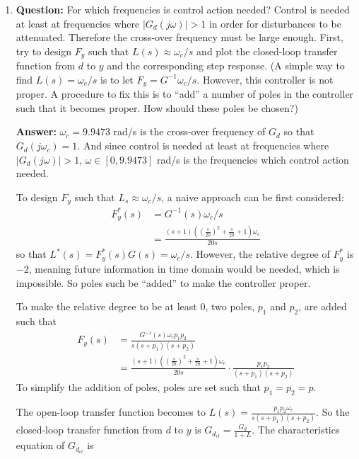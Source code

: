\documentclass[11pt,a4paper]{article}
\begin{document}
\begin{enumerate}[(1)]
	\item \textbf{Question:} For which frequencies is control action needed? Control is needed at least at frequencies where $\vert G_{d}(j\omega) \vert > 1$ in order for disturbances to be attenuated. Therefore the cross-over frequency must be large enough. First, try to design $F_{y}$ such that $L(s) \approx \omega_{c} / s$ and plot the closed-loop transfer function from $d$ to $y$ and the corresponding step response. (A simple way to find $L(s) = \omega_{c} / s$ is to let $F_{y} = G^{-1} \omega_{c} / s$. However, this controller is not proper. A procedure to fix this is to ``add'' a number of poles in the controller such that it becomes proper. How should these poles be chosen?)
	\par \textbf{Answer:} $\omega_{c} = 9.9473$ rad/s is the cross-over frequency of $G_{d}$ so that $G_{d}(j\omega_{c}) = 1$. And since control is needed at least at frequencies where $\vert G_{d}(j\omega) \vert > 1$, $\omega \in [0, 9.9473]$ rad/s is the frequencies which control action needed.
	\par To design $F_{y}$ such that $L_{s} \approx \omega_{c} / s$, a naive approach can be first considered:
	\begin{align*}
		F_{y}^{*}(s) &= G^{-1}(s) \omega_{c} / s \\
		&= \frac{(s+1)((\frac{s}{20})^{2}+\frac{s}{20}+1)\omega_{c}}{20s}
	\end{align*}
	so that $L^{*}(s) = F_{y}^{*}(s) G(s) = \omega_{c} / s$. However, the relative degree of $F_{y}^{*}$ is $-2$, meaning future information in time domain would be needed, which is impossible. So poles such be ``added'' to make the controller proper.
	\par To make the relative degree to be at least $0$, two poles, $p_{1}$ and $p_{2}$, are added such that
	\begin{align*}
		F_{y}(s) &= \frac{G^{-1}(s)\omega_{c}p_{1}p_{2}}{s(s+p_{1})(s+p_{2})} \\
		&= \frac{(s+1)((\frac{s}{20})^{2}+\frac{s}{20}+1)\omega_{c}}{20s} \cdot \frac{p_{1}p_{2}}{(s+p_{1})(s+p_{2})}
	\end{align*}
	To simplify the addition of poles, poles are set such that $p_{1}=p_{2}=p$.
	\par The open-loop transfer function becomes to $L(s) = \frac{p_{1}p_{2}\omega_{c}}{s(s+p_{1})(s+p_{2})}$. So the closed-loop transfer function from $d$ to $y$ is $G_{d_{cl}}=\frac{G_{d}}{1+L}$. The characteristics equation of $G_{d_{cl}}$ is

\end{enumerate}
\end{document}
